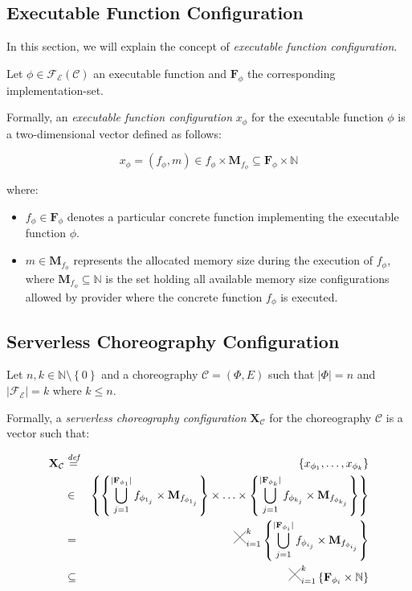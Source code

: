 \documentclass[12pt,a4paper]{report}
\newcommand{\Cross}{\mathbin{\tikz [x=2.5ex,y=2.5ex,line width=.10ex] \draw (0,0) -- (1,1) (0,1) -- (1,0);}}
\newcommand*{\N}{\mathbb{N}}
\newcommand{\mathDef}{\overset{\textit{def}}{=}}
\theoremstyle{definition}
\begin{document}
\subsection{Executable Function Configuration}

In this section, we will explain the concept of \textit{executable function configuration}. 

Let $\phi \in \mathscr{F_E}(\mathcal{C})$ an executable function and $\textbf{F}_{\phi}$ the corresponding implementation-set.

Formally, an \textit{executable function configuration} $x_{\phi}$ for the executable function $\phi$ is a two-dimensional vector defined as follows:

\begin{equation}
	x_{\phi} = (f_{\phi},m) \in f_{\phi} \times \textbf{M}_{f_{\phi}} \subseteq \textbf{F}_{\phi} \times \N
\end{equation}

where:

\begin{itemize}
	\item $f_{\phi} \in \textbf{F}_{\phi}$  denotes a particular concrete function implementing the executable function $\phi$.
	\item $m \in \textbf{M}_{f_{\phi}}$ represents the allocated memory size during the execution of $f_{\phi}$, where $\textbf{M}_{f_{\phi}} \subseteq \N$ is the set holding all available memory size configurations allowed by provider where the concrete function $f_{\phi}$ is executed.
\end{itemize}

\subsection{Serverless Choreography Configuration}

Let $n,k \in \N \setminus \left\lbrace 0 \right\rbrace$ and a choreography $\mathcal{C} = (\Phi,E)$ such that $|\Phi| = n$ and $|\mathscr{F_E}| = k$ where $k \leq n$.

Formally, a \textit{serverless choreography configuration} $\textbf{X}_{\mathcal{C}}$ for the choreography $\mathcal{C}$ is a vector such that:

\begin{eqnarray}
	\textbf{X}_{\mathcal{C}} & \mathDef & \left\lbrace x_{\phi_{1}}, \ldots, x_{\phi_{k}} \right\rbrace \nonumber \\ 
	& \in & \left\{  \left\{ \bigcup_{j=1}^{|\textbf{F}_{\phi_{1}}|} f_{\phi_{1_j}} \times \textbf{M}_{f_{\phi_{1_j}}} \right\} \times \ldots \times \left\{ \bigcup_{j=1}^{|\textbf{F}_{\phi_{k}}|} f_{\phi_{k_j}} \times \textbf{M}_{f_{\phi_{k_j}}} \right\} \right\}  \nonumber \\
	& = & \Cross_{i = 1}^k \left\{ \bigcup_{j=1}^{|\textbf{F}_{\phi_{i}}|} f_{\phi_{i_j}} \times \textbf{M}_{f_{\phi_{i_j}}} \right\} \nonumber \\
	& \subseteq & \Cross_{i = 1}^k \left\{ \textbf{F}_{\phi_{i}} \times \mathbb{N} \right\}
\end{eqnarray}
\end{document}
